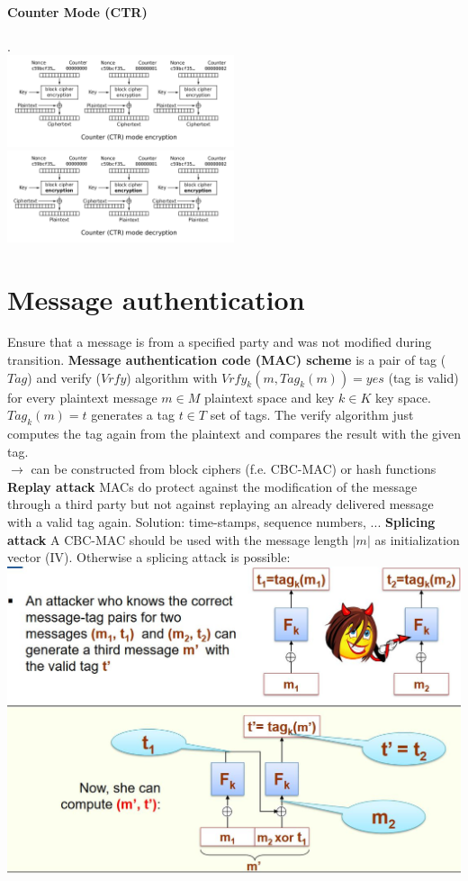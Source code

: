 \documentclass[12pt]{article}
\begin{document}
	\paragraph{Counter Mode (CTR)} .\\
	\includegraphics[width=0.5\textwidth]{figures/Ctr_encryption.png}
	\includegraphics[width=0.5\textwidth]{figures/Ctr_decryption.png}
	
	\section{Message authentication}
	Ensure that a message is from a specified party and was not modified during transition.
	\textbf{Message authentication code (MAC) scheme} is a pair of tag ($Tag$) and verify ($Vrfy$) algorithm with $Vrfy_k(m,Tag_k(m)) = yes$ (tag is valid) for every plaintext message $m \in M$ plaintext space and key $k \in K$ key space. $Tag_k(m) = t$ generates a tag $t \in T$ set of tags. The verify algorithm just computes the tag again from the plaintext and compares the result with the given tag.\\
	$\rightarrow$ can be constructed from block ciphers (f.e. CBC-MAC) or hash functions\\
	\textbf{Replay attack} MACs do protect against the modification of the message through a third party but not against replaying an already delivered message with a valid tag again. Solution: time-stamps, sequence numbers, ...
	\textbf{Splicing attack} A CBC-MAC should be used with the message length $|m|$ as initialization vector (IV). Otherwise a splicing attack is possible:\\
	\includegraphics[width=\textwidth]{figures/splicing-attack.JPG}
	
\end{document}
